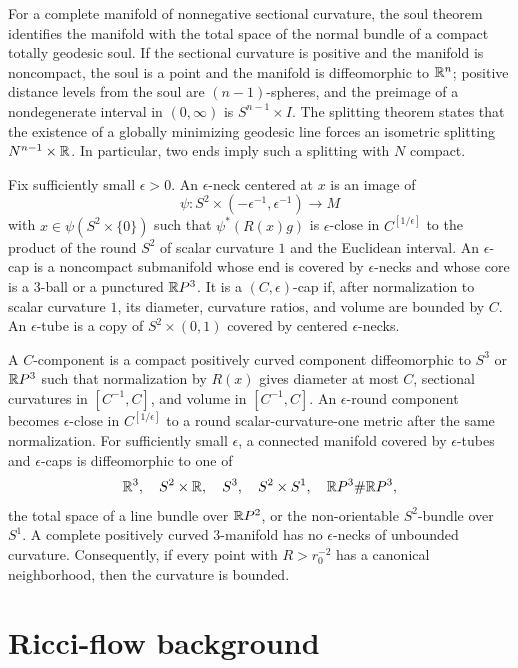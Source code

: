 For a complete manifold of nonnegative sectional curvature, the soul theorem
identifies the manifold with the total space of the normal bundle of a compact
totally geodesic soul. If the sectional curvature is positive and the manifold
is noncompact, the soul is a point and the manifold is diffeomorphic to
$\mathbb{R}^n$; positive distance levels from the soul are $(n-1)$-spheres, and the
preimage of a nondegenerate interval in $(0,\infty)$ is
$S^{n-1}\times I$. The splitting theorem states that the existence of a
globally minimizing geodesic line forces an isometric splitting
$N^{n-1}\times\mathbb{R}$. In particular, two ends imply such a splitting with $N$
compact.

Fix sufficiently small $\epsilon>0$. An $\epsilon$-neck centered at $x$ is an
image of
\[
  \psi:S^2\times(-\epsilon^{-1},\epsilon^{-1})\longrightarrow M
\]
with $x\in\psi(S^2\times\{0\})$ such that
$\psi^*(R(x)g)$ is $\epsilon$-close in $C^{[1/\epsilon]}$ to the product of
the round $S^2$ of scalar curvature $1$ and the Euclidean interval. An
$\epsilon$-cap is a noncompact submanifold whose end is covered by
$\epsilon$-necks and whose core is a $3$-ball or a punctured $\mathbb{R} P^3$. It is
a $(C,\epsilon)$-cap if, after normalization to scalar curvature $1$, its
diameter, curvature ratios, and volume are bounded by $C$. An
$\epsilon$-tube is a copy of $S^2\times(0,1)$ covered by centered
$\epsilon$-necks.

A $C$-component is a compact positively curved component diffeomorphic to
$S^3$ or $\mathbb{R} P^3$ such that normalization by $R(x)$ gives diameter at most
$C$, sectional curvatures in $[C^{-1},C]$, and volume in $[C^{-1},C]$. An
$\epsilon$-round component becomes $\epsilon$-close in
$C^{[1/\epsilon]}$ to a round scalar-curvature-one metric after the same
normalization. For sufficiently small $\epsilon$, a connected manifold
covered by $\epsilon$-tubes and $\epsilon$-caps is diffeomorphic to one of
\[
\mathbb{R}^3,\quad S^2\times\mathbb{R},\quad S^3,\quad S^2\times S^1,\quad
\mathbb{R} P^3\#\mathbb{R} P^3,
\]
the total space of a line bundle over $\mathbb{R} P^2$, or the non-orientable
$S^2$-bundle over $S^1$. A complete positively curved $3$-manifold has no
$\epsilon$-necks of unbounded curvature. Consequently, if every point with
$R>r_0^{-2}$ has a canonical neighborhood, then the curvature is bounded.

\section{Ricci-flow background}

